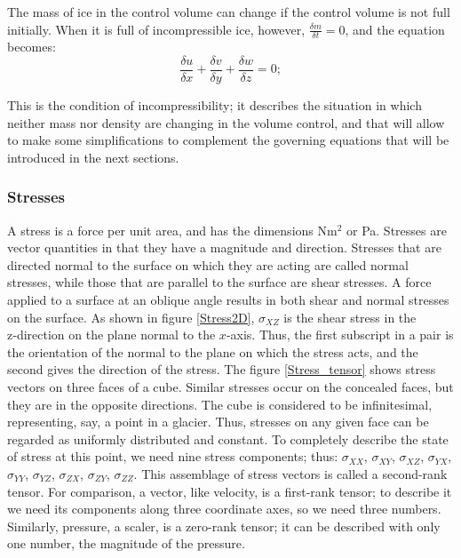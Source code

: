 \documentclass{article}
\begin{document}
The mass of ice in the control volume can change if the control volume is not full initially. When it is full of incompressible ice, however, $\frac{\delta m}{\delta t}=0$, and the equation becomes:
\begin{equation}
	\frac{\delta u}{\delta x}+\frac{\delta v}{\delta y}+\frac{\delta w}{\delta z}=0;
\end{equation}

This is the condition of incompressibility; it describes the situation in which neither mass nor density are changing in the volume control, and that will allow to make some simplifications to complement the governing equations that will be introduced in the next sections. 
\subsubsection{Stresses}
A stress is a force per unit area, and has the dimensions Nm$^2$ or Pa. Stresses are vector quantities in that they have a magnitude and direction. Stresses that are directed normal to the surface on which they are acting are called normal stresses, while those that are parallel to the surface are shear stresses. A force applied to a surface at an oblique angle results in both shear and normal stresses on the surface.
As shown in figure \ref{Stress2D}, $\sigma_{XZ}$ is the shear stress in the z‑direction on the plane normal to the $x$-axis. Thus, the ﬁrst subscript in a pair is the orientation of the normal to the plane on which the stress acts, and the second gives the direction of the stress. The figure \ref{Stress_tensor} shows stress vectors on three faces of a cube. Similar stresses occur on the concealed faces, but they are in the opposite directions. The cube is considered to be infinitesimal, representing, say, a point in a glacier. Thus, stresses on any given face can be regarded as uniformly distributed and constant. To completely describe the state of stress at this point, we need nine stress components; thus: $\sigma_{XX}$, $\sigma_{XY}$, $\sigma_{XZ}$, $\sigma_{YX}$, $\sigma_{YY}$, $\sigma_{YZ}$, $\sigma_{ZX}$, $\sigma_{ZY}$, $\sigma_{ZZ}$. This assemblage of stress vectors is called a second-rank tensor. For comparison, a vector, like velocity, is a ﬁrst-rank tensor; to describe it we need its components along three coordinate axes, so we need three numbers. Similarly, pressure, a scaler, is a zero-rank tensor; it can be described with only one number, the magnitude of the pressure.
\end{document}

